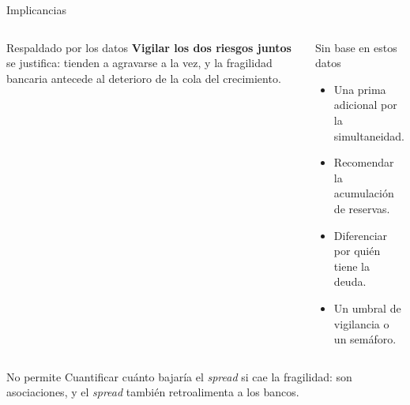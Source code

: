 \documentclass[aspectratio=169]{beamer}
\begin{document}
\begin{frame}{Implicancias}
\begin{columns}[T]
\begin{block}{Respaldado por los datos}
\small
\textbf{Vigilar los dos riesgos juntos} se justifica: tienden a agravarse a la vez, y la fragilidad bancaria antecede al deterioro de la cola del crecimiento.
\end{block}
\begin{exampleblock}{Sin base en estos datos}
\small
\begin{itemize}
\item Una prima adicional por la simultaneidad.
\item Recomendar la acumulación de reservas.
\item Diferenciar por quién tiene la deuda.
\item Un umbral de vigilancia o un semáforo.
\end{itemize}
\end{exampleblock}
\end{columns}
\vspace{8pt}
\begin{alertblock}{No permite}
Cuantificar cuánto bajaría el \textit{spread} si cae la fragilidad: son asociaciones, y el \textit{spread} también retroalimenta a los bancos.
\end{alertblock}
\end{frame}
\end{document}
